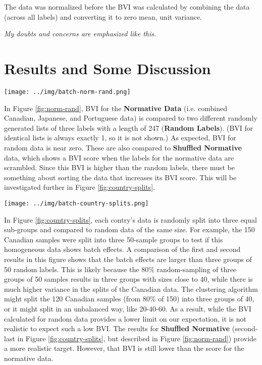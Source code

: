 \documentclass[12pt]{article}
\begin{document}
The data was normalized before the BVI was calculated by combining the data (across all labels) and converting it to zero mean, unit variance.

\emph{My doubts and concerns are emphasized like this.}

\pagebreak

\section*{Results and Some Discussion}

\begin{figure*}[ht]
  \centering
       \texttt{[image: ../img/batch-norm-rand.png]}
         \caption{}
  \label{fig:norm-rand}
\end{figure*}

In Figure \ref{fig:norm-rand}, BVI for the \textbf{Normative Data} (i.e. combined Canadian, Japanese, and Portuguese data) is compared to two different randomly generated lists of three labels with a length of 247 (\textbf{Random Labels}). (BVI for identical lists is always exactly 1, so it is not shown.) As expected, BVI for random data is near zero. These are also compared to \textbf{Shuffled Normative} data, which shows a BVI score when the labels for the normative data are scrambled. Since this BVI is higher than the random labels, there must be something about sorting the data that increases its BVI score. This will be investigated further in Figure \ref{fig:country-splits}.

\pagebreak

\begin{figure*}
  \centering
       \texttt{[image: ../img/batch-country-splits.png]}
         \caption{}
  \label{fig:country-splits}
\end{figure*}

In Figure \ref{fig:country-splits}, each contry's data is randomly split into three equal sub-groups and compared to random data of the same size. For example, the 150 Canadian samples were split into three 50-sample groups to test if this homogeneous data shows batch effects. A comparison of the first and second results in this figure shows that the batch effects are larger than three groups of 50 random labels. This is likely because the 80\% random-sampling of three groups of 50 samples results in three groups with sizes close to 40, while there is much higher variance in the splits of the Canadian data. The clustering algorithm might split the 120 Canadian samples (from 80\% of 150) into three groups of 40, or it might split in an unbalanced way, like 20-40-60. As a result, while the BVI calculated for random data provides a lower limit on our expectation, it is not realistic to expect such a low BVI. The results for \textbf{Shuffled Normative} (second-last in Figure \ref{fig:country-splits}, but described in Figure \ref{fig:norm-rand}) provide a more realistic target. However, that BVI is still lower than the score for the normative data.
\end{document}
